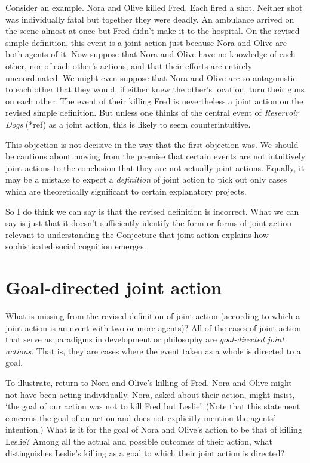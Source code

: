 \documentclass[12pt,a4paper]{extarticle}
\begin{document}
Consider an example.
Nora and Olive killed Fred.  
Each fired a shot.
Neither shot was individually fatal but together they were deadly.
An ambulance arrived on the scene almost at once but Fred didn't make it to the hospital.
On the revised simple definition, this event is a joint action just because Nora and Olive are both agents of it.
Now suppose that Nora and Olive have no knowledge of each other, nor of each other's actions, and that their efforts are entirely uncoordinated.
We might even suppose that Nora and Olive are so antagonistic to each other that they would, if either knew the other's location, turn their guns on each other.
The event of their killing Fred is nevertheless a joint action on the revised simple definition.
But unless one thinks of the central event of \emph{Reservoir Dogs} (*ref) as a joint action, this is likely to seem counterintuitive.

This objection is not decisive in the way that the first objection was.
We should be cautious about moving from the premise that certain events are not intuitively joint actions to the conclusion that they are not actually joint actions.
Equally, it may be a mistake to expect a \emph{definition} of joint action to pick out only cases which are theoretically significant to certain explanatory projects.

So I do think we can say is that the revised definition is incorrect.
What we can say is just that it doesn't sufficiently identify the form or forms of joint action relevant to understanding the Conjecture that joint action explains how sophisticated social cognition emerges.



\section{Goal-directed joint action}
What is missing from the revised definition of joint action (according to which a joint action is an event with two or more agents)?
All of the cases of joint action that serve as paradigms in development or philosophy are \emph{goal-directed joint actions}.
That is, they are cases where the event taken as a whole is directed to a goal.

To illustrate, return to Nora and Olive's killing of Fred.
Nora and Olive might not have been acting individually.  
Nora, asked about their action, might insist, `the goal of our action was not to kill Fred but Leslie'.
(Note that this statement concerns the goal of an action and does not explicitly mention the agents' intention.)
What is it for the goal of Nora and Olive's action to be that of killing Leslie?
Among all the actual and possible outcomes of their action, what distinguishes Leslie's killing as a goal to which their joint action is directed?
\end{document}
